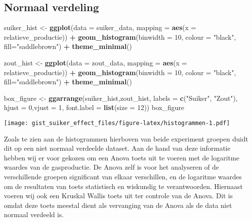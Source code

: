 \documentclass[
]{article}
\newenvironment{Shaded}{\begin{snugshade}}{\end{snugshade}}
\newcommand{\AttributeTok}[1]{\textcolor[rgb]{0.13,0.29,0.53}{#1}}
\newcommand{\DecValTok}[1]{\textcolor[rgb]{0.00,0.00,0.81}{#1}}
\newcommand{\FunctionTok}[1]{\textcolor[rgb]{0.13,0.29,0.53}{\textbf{#1}}}
\newcommand{\NormalTok}[1]{#1}
\newcommand{\OtherTok}[1]{\textcolor[rgb]{0.56,0.35,0.01}{#1}}
\newcommand{\SpecialCharTok}[1]{\textcolor[rgb]{0.81,0.36,0.00}{\textbf{#1}}}
\newcommand{\StringTok}[1]{\textcolor[rgb]{0.31,0.60,0.02}{#1}}
\let\origfigure\figure
\let\endorigfigure\endfigure
\renewenvironment{figure}[1][2] {
    \expandafter\origfigure\expandafter[H]
} {
    \endorigfigure
}
\begin{document}
\subsection{Normaal verdeling}\label{normaal-verdeling}

\begin{Shaded}
\begin{Highlighting}[]
\NormalTok{suiker\_hist }\OtherTok{\textless{}{-}} \FunctionTok{ggplot}\NormalTok{(}\AttributeTok{data =}\NormalTok{ suiker\_data, }
       \AttributeTok{mapping =} \FunctionTok{aes}\NormalTok{(}\AttributeTok{x =}\NormalTok{ relatieve\_productie)) }\SpecialCharTok{+}
    \FunctionTok{geom\_histogram}\NormalTok{(}\AttributeTok{binwidth =} \DecValTok{10}\NormalTok{, }\AttributeTok{colour =} \StringTok{"black"}\NormalTok{, }\AttributeTok{fill=}\StringTok{"saddlebrown"}\NormalTok{) }\SpecialCharTok{+} 
    \FunctionTok{theme\_minimal}\NormalTok{()}

\NormalTok{zout\_hist }\OtherTok{\textless{}{-}} \FunctionTok{ggplot}\NormalTok{(}\AttributeTok{data =}\NormalTok{ zout\_data,}
       \AttributeTok{mapping =} \FunctionTok{aes}\NormalTok{(}\AttributeTok{x =}\NormalTok{ relatieve\_productie)) }\SpecialCharTok{+}
    \FunctionTok{geom\_histogram}\NormalTok{(}\AttributeTok{binwidth =} \DecValTok{10}\NormalTok{, }\AttributeTok{colour =} \StringTok{"black"}\NormalTok{, }\AttributeTok{fill=}\StringTok{"saddlebrown"}\NormalTok{) }\SpecialCharTok{+} 
    \FunctionTok{theme\_minimal}\NormalTok{()}

\NormalTok{box\_figure }\OtherTok{\textless{}{-}} \FunctionTok{ggarrange}\NormalTok{(suiker\_hist,zout\_hist,}
                        \AttributeTok{labels =} \FunctionTok{c}\NormalTok{(}\StringTok{"Suiker"}\NormalTok{, }\StringTok{"Zout"}\NormalTok{), }
                        \AttributeTok{hjust =} \DecValTok{0}\NormalTok{,}\AttributeTok{vjust =} \DecValTok{1}\NormalTok{,}
                        \AttributeTok{font.label =} \FunctionTok{list}\NormalTok{(}\AttributeTok{size =} \DecValTok{12}\NormalTok{))}
\NormalTok{box\_figure}
\end{Highlighting}
\end{Shaded}

\begin{figure}
\centering
\texttt{[image: gist\_suiker\_effect\_files/figure-latex/histogrammen-1.pdf]}
\caption{\label{fig:histogrammen}Histogrammen over de gasproductie van gist}
\end{figure}

Zoals te zien aan de histogrammen hierboven van beide experiment groepen duidt dit op een niet normaal verdeelde dataset. Aan de hand van deze informatie hebben wij er voor gekozen om een Anova toets uit te voeren met de logaritme waardes van de gasproductie. De Anova zelf is voor het analyseren of de verschillende groepen significant van elkaar verschillen, en de logaritme waardes om de resultaten van toets statistisch en wiskundig te verantwoorden.
Hiernaast voeren wij ook een Kruskal Wallis toets uit ter controle van de Anova. Dit is omdat deze toets meestal dient als vervanging van de Anova als de data niet normaal verdeeld is.
\end{document}
